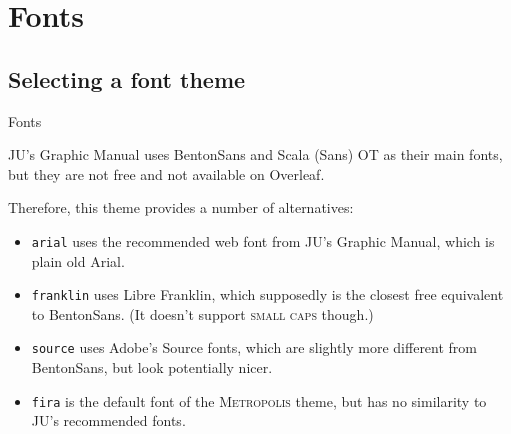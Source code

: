 \documentclass[10pt]{beamer}
\begin{document}
\section{Fonts}
\label{sec:fonts}

\subsection{Selecting a font theme}

\begin{frame}[fragile,label=selectfonts]{Fonts}

JU's Graphic Manual uses \alert{BentonSans} and \alert{Scala (Sans) OT} as their main fonts, but they are not free and not available on Overleaf.\medskip

  Therefore, this theme provides a number of alternatives:
  
      \begin{itemize}
        \item \alert{\texttt{arial}} uses the recommended web font from JU's Graphic Manual, which is plain old Arial.
        \item \alert{\texttt{franklin}} uses Libre Franklin, which supposedly is the closest free equivalent to BentonSans.  (It doesn't support \textsc{small caps} though.)
        \item \alert{\texttt{source}} uses Adobe's Source fonts, which are slightly more different from BentonSans, but look potentially nicer.
        \item \alert{\texttt{fira}} is the default font of the \textsc{Metropolis} theme, but has no similarity to JU's recommended fonts.
    \end{itemize}
\end{frame}
\end{document}
